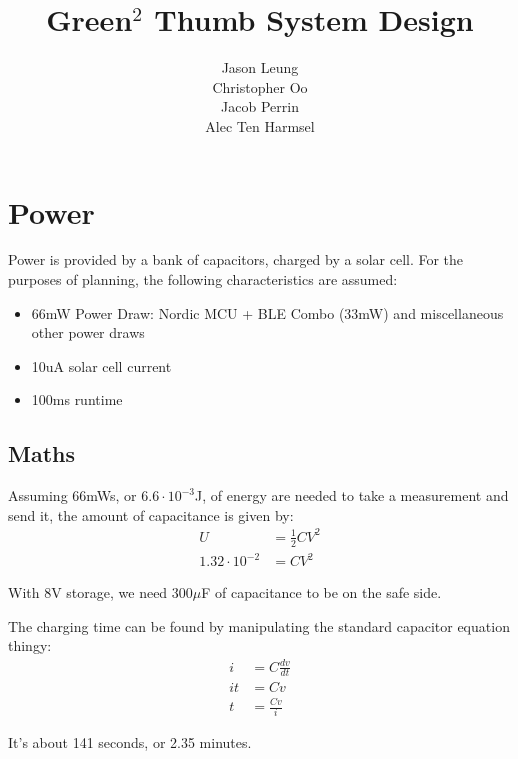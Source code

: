\documentclass{article}
\begin{document}
\title{Green$^2$ Thumb System Design}
\author{
    Jason Leung\\
    Christopher Oo\\
    Jacob Perrin\\
    Alec Ten Harmsel
}
\date{}
\maketitle

\section{Power}
Power is provided by a bank of capacitors, charged by a solar cell. For the
purposes of planning, the following characteristics are assumed:

\begin{itemize}
    \item 66mW Power Draw: Nordic MCU + BLE Combo (33mW) and miscellaneous
        other power draws
    \item 10uA solar cell current
    \item 100ms runtime
\end{itemize}

\subsection{Maths}
Assuming 66mWs, or $6.6\cdot10^{-3}$J, of energy are needed to take a
measurement and send it, the amount of capacitance is given by: \begin{align*}
    U & = \frac{1}{2}CV^2\\
    1.32 \cdot 10^{-2} & = CV^2
\end{align*}

With 8V storage, we need 300$\mu$F of capacitance to be on the safe side.

The charging time can be found by manipulating the standard capacitor equation
thingy: \begin{align*}
    i & = C\frac{dv}{dt}\\
    it & = Cv\\
    t & = \frac{Cv}{i}
\end{align*}

It's about 141 seconds, or 2.35 minutes.
\end{document}
